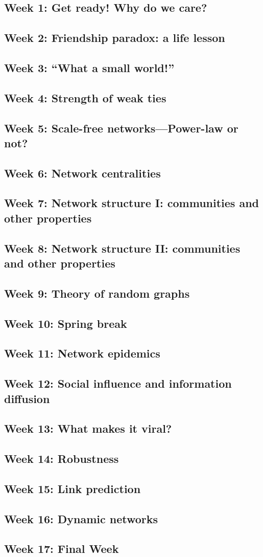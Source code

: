 \documentclass[11pt,article,oneside]{memoir} %
\begin{document}
\subsection{Week 1:  Get ready! Why do we care?}
\subsection{Week 2:  Friendship paradox: a life lesson}
\subsection{Week 3:  ``What a small world!''}
\subsection{Week 4:  Strength of weak ties}
\subsection{Week 5:  Scale-free networks---Power-law or not?} 
\subsection{Week 6:  Network centralities}
\subsection{Week 7:  Network structure I: communities and other properties} 
\subsection{Week 8:  Network structure II: communities and other properties}
\subsection{Week 9:  Theory of random graphs}
\subsection{\color{gray}Week 10: Spring break}
\subsection{Week 11: Network epidemics}
\subsection{Week 12: Social influence and information diffusion}
\subsection{Week 13: What makes it viral?}
\subsection{Week 14: Robustness}
\subsection{Week 15: Link prediction}
\subsection{Week 16: Dynamic networks}
\subsection{Week 17: Final Week}
\end{document}
